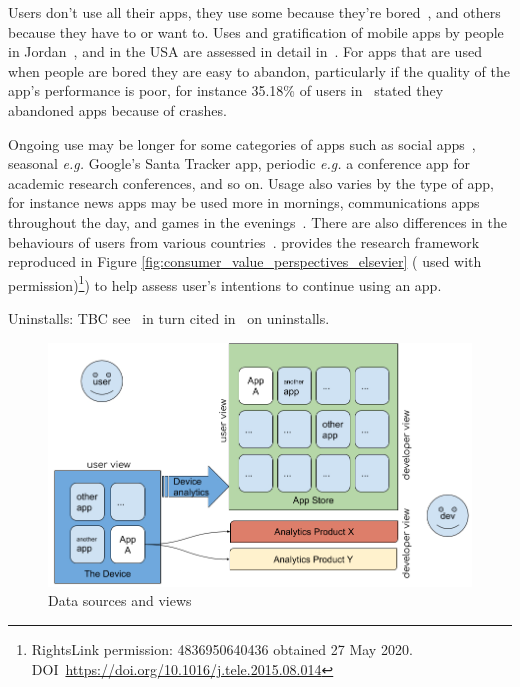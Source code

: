 Users don't use all their apps, they use some because they're bored~\cite{pielot2015attention}, and others because they have to or want to. Uses and gratification of mobile apps by people in Jordan~\cite{ALNAWAS2016313}, and in the USA are assessed in detail in~\cite{gerlich2015app}. For apps that are used when people are bored they are easy to abandon, particularly if the quality of the app's performance is poor, for instance 35.18\% of users in~\cite{lim_investigating_country_differences} stated they abandoned apps because of crashes. 

Ongoing use may be longer for some categories of apps such as social apps~\cite{HSIAO2016342}, seasonal \emph{e.g.} Google's Santa Tracker app, periodic \emph{e.g.} a conference app for academic research conferences, and so on. Usage also varies by the type of app, for instance news apps may be used more in mornings, communications apps throughout the day, and games in the evenings~\cite{bohmer2011falling_asleep_with_angry_birds}. There are also differences in the behaviours of users from various countries~\cite{lim_investigating_country_differences}.  
\cite{HSIAO2016342} provides the research framework reproduced in Figure \ref{fig:consumer_value_perspectives_elsevier} ( used with permission)\footnote{RightsLink permission: 4836950640436 obtained 27 May 2020. DOI~\url{https://doi.org/10.1016/j.tele.2015.08.014}}) to help assess user's intentions to continue using an app.

Uninstalls: TBC see~\cite{bohmer2011falling_asleep_with_angry_birds} in turn cited in~\cite{lim_investigating_country_differences} on uninstalls. %

\begin{figure}[ht]
    \centering
    \includegraphics[width=\textwidth]{images/data_sources_and_views_25_jan_2020.jpg}
    \caption{Data sources and views}
    \label{fig:data_sources_and_views}
\end{figure}

